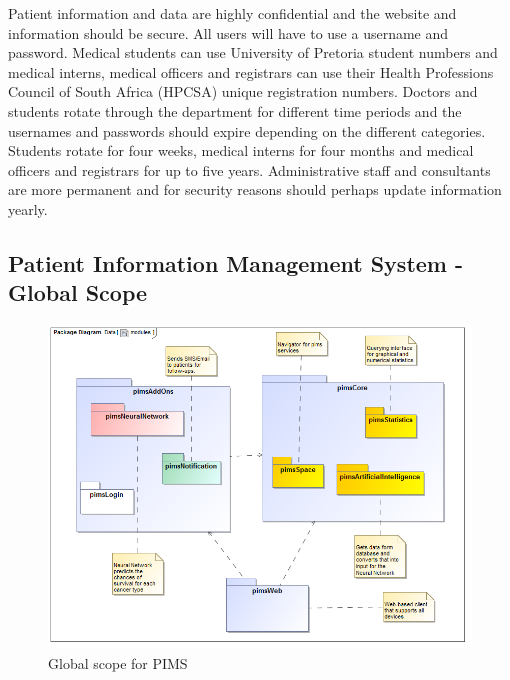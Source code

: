 Patient  information  and  data  are  highly  confidential  and  the  website  and 
information  should  be  secure.  All  users  will  have  to  use  a  username  and 
password. Medical students can use University of Pretoria student numbers and 
medical interns, medical officers and registrars can use their Health Professions 
Council  of  South  Africa  (HPCSA)  unique  registration  numbers.  Doctors  and 
students  rotate  through  the  department  for  different  time  periods  and  the 
usernames and passwords should expire depending on the different categories. 
Students  rotate  for  four  weeks,  medical  interns  for  four  months  and medical 
officers and registrars  for  up  to  five  years.  Administrative  staff  and  consultants 
are more permanent and for security reasons should perhaps update information 
yearly. \par


\subsection{Patient Information Management System - Global Scope}
\begin{description}
\begin{figure}[H]
	\centerline{\includegraphics[width=\linewidth]{./Graphics/globalImages/modules}}
	\caption{Global scope for PIMS}
\end{figure}
\end{description}
